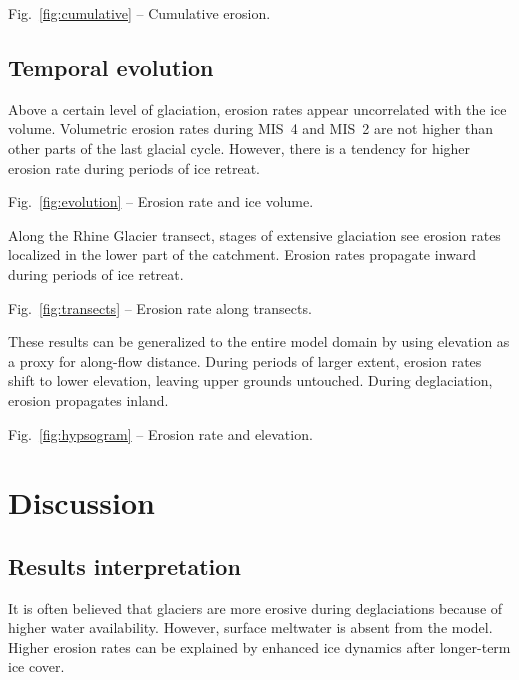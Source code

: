 \documentclass[utf8]{article}
\begin{document}
    Fig.~\ref{fig:cumulative} -- Cumulative erosion.

\subsection{Temporal evolution}

    Above a certain level of glaciation, erosion rates appear uncorrelated with
    the ice volume. Volumetric erosion rates during MIS~4 and MIS~2 are not
    higher than other parts of the last glacial cycle. However, there is a
    tendency for higher erosion rate during periods of ice retreat.

    Fig.~\ref{fig:evolution} -- Erosion rate and ice volume.

    Along the Rhine Glacier transect, stages of extensive glaciation see
    erosion rates localized in the lower part of the catchment. Erosion rates
    propagate inward during periods of ice retreat.

    Fig.~\ref{fig:transects} -- Erosion rate along transects.

    These results can be generalized to the entire model domain by using
    elevation as a proxy for along-flow distance. During periods of larger
    extent, erosion rates shift to lower elevation, leaving upper grounds
    untouched. During deglaciation, erosion propagates inland.

    Fig.~\ref{fig:hypsogram} -- Erosion rate and elevation.

\section{Discussion}

\subsection{Results interpretation}

    It is often believed that glaciers are more erosive during deglaciations
    because of higher water availability. However, surface meltwater is absent
    from the model. Higher erosion rates can be explained by enhanced ice
    dynamics after longer-term ice cover.
\end{document}
